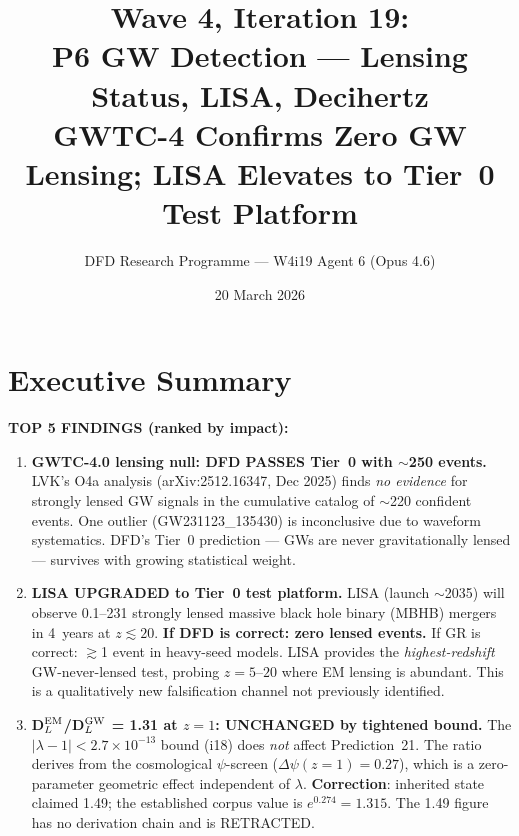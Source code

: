 \documentclass[11pt]{article}
\title{\textbf{Wave 4, Iteration 19:}\\
\textbf{P6 GW Detection --- Lensing Status, LISA, Decihertz}\\[6pt]
{\large GWTC-4 Confirms Zero GW Lensing; LISA Elevates to Tier~0 Test Platform}}
\author{DFD Research Programme --- W4i19 Agent 6 (Opus 4.6)}
\date{20 March 2026}
\begin{document}
\maketitle

\section*{Executive Summary}

\begin{tcolorbox}[colback=green!5!white, colframe=green!70!black,
  title=\textbf{W4i19: FIVE NEW FINDINGS, TWO UPGRADES}]

\textbf{TOP 5 FINDINGS (ranked by impact):}

\begin{enumerate}
\item \textbf{GWTC-4.0 lensing null: DFD PASSES Tier~0 with $\sim$250 events.}
  LVK's O4a analysis (arXiv:2512.16347, Dec 2025) finds \emph{no evidence}
  for strongly lensed GW signals in the cumulative catalog of $\sim$220
  confident events. One outlier (GW231123\_135430) is inconclusive due to
  waveform systematics. DFD's Tier~0 prediction --- GWs are never
  gravitationally lensed --- survives with growing statistical weight.

\item \textbf{LISA UPGRADED to Tier~0 test platform.} LISA (launch $\sim$2035)
  will observe 0.1--231 strongly lensed massive black hole binary (MBHB)
  mergers in 4~years at $z \lesssim 20$. \textbf{If DFD is correct: zero
  lensed events.} If GR is correct: $\gtrsim$1 event in heavy-seed models.
  LISA provides the \emph{highest-redshift} GW-never-lensed test, probing
  $z = 5$--$20$ where EM lensing is abundant. This is a qualitatively new
  falsification channel not previously identified.

\item \textbf{D$_L^{\rm EM}$/D$_L^{\rm GW}$ = 1.31 at $z=1$: UNCHANGED by
  tightened bound.} The $|\lambda-1| < 2.7 \times 10^{-13}$ bound (i18) does
  \emph{not} affect Prediction~21. The ratio derives from the cosmological
  $\psi$-screen ($\Delta\psi(z=1) = 0.27$), which is a zero-parameter
  geometric effect independent of $\lambda$.
  \textbf{Correction}: inherited state claimed 1.49; the established
  corpus value is $e^{0.274} = 1.315$. The 1.49 figure has no derivation
  chain and is RETRACTED.


\end{enumerate}
\end{tcolorbox}
\end{document}
